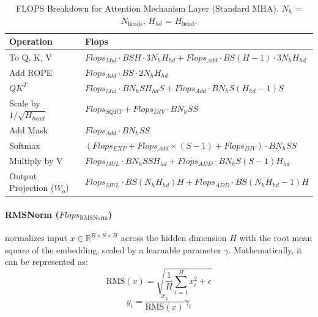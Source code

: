 \documentclass{article}
\begin{document}
\begin{table}[!h]
\renewcommand{\arraystretch}{1.4} \centering \setlength{\tabcolsep}{8pt}
\begin{tabular}{@{}ll@{}} %
    \toprule \textbf{Operation} & \textbf{Flops} \\ \midrule
    To Q, K, V & $Flops_{Mul} \cdot BSH \cdot 3 N_{h} H_{hd} + Flops_{Add} \cdot BS(H-1) \cdot 3 N_{h} H_{hd}$ \\ %
    Add ROPE & $Flops_{Add} \cdot BS \cdot 2 N_{h} H_{hd}$ \\ %
    $QK^T$ & $Flops_{Mul} \cdot B N_{h} S H_{hd} S + Flops_{Add} \cdot B N_{h} S (H_{hd}-1) S$ \\
    Scale by $1/\sqrt{H_{head}}$ & $Flops_{SQRT} + Flops_{DIV} \cdot B N_{h} S S$ \\ %
    Add Mask & $Flops_{Add} \cdot B N_{h} S S$ \\ %
    Softmax & $(Flops_{EXP} + Flops_{Add} \times (S-1) + Flops_{DIV}) \cdot B N_{h} S S$ \\ %
    Multiply by V & $Flops_{MUL} \cdot B N_{h} S S H_{hd} + Flops_{ADD} \cdot B N_{h} S (S - 1) H_{hd}$ \\
    Output Projection ($W_o$) & $Flops_{MUL} \cdot B S (N_{h} H_{hd}) H + Flops_{ADD} \cdot B S (N_{h} H_{hd} - 1) H$ \\
    \bottomrule
\end{tabular}
\caption{FLOPS Breakdown for Attention Mechanism Layer (Standard MHA). $N_h$ = $N_{\text{heads}}$, $H_{hd}$ = $H_{\text{head}}$.} %
\label{tab:attention_flops}
\end{table}

\paragraph{RMSNorm ($Flops_{\text{RMSNorm}}$)}
normalizes input $x \in \mathbb{R}^{B \times S \times H}$ across the hidden dimension $H$ with the root mean square of the embedding, scaled by a learnable parameter $\gamma$. Mathematically, it can be represented as:
\begin{equation}
    \text{RMS}(x) = \sqrt{\frac{1}{H} \sum_{i=1}^{H} x_i^2 + \epsilon}
\end{equation}
\begin{equation}
    y_i = \frac{x_i}{\text{RMS}(x)} \gamma_i
\end{equation}
\end{document}
